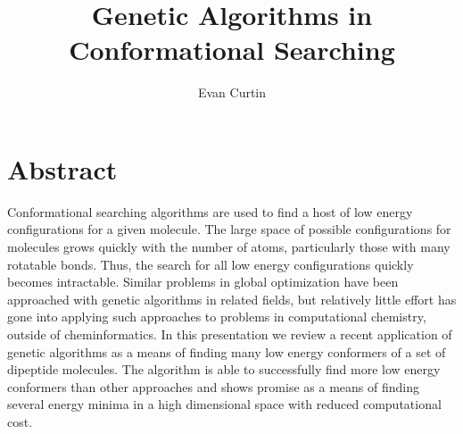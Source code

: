 \documentclass{revtex4}
\begin{document}
\title{Genetic Algorithms in Conformational Searching}
\author{Evan Curtin}
\maketitle

\section{Abstract}
 Conformational searching algorithms are used to find a host of low energy configurations for a 
 given molecule. The large space of possible configurations for molecules grows quickly with the 
 number of atoms, particularly those with many rotatable bonds. Thus, the search for all low energy 
 configurations quickly becomes intractable. Similar problems in global optimization have been 
 approached with genetic algorithms in related fields, but relatively little effort has gone into 
 applying such approaches to problems in computational chemistry, outside of cheminformatics. In 
 this presentation we review a recent application of genetic algorithms as a means of finding many 
 low energy conformers of a set of dipeptide molecules. The algorithm is able to successfully find 
 more low energy conformers than other approaches and shows promise as a means of finding several 
 energy minima in a high dimensional space with reduced computational cost. 
\end{document}
